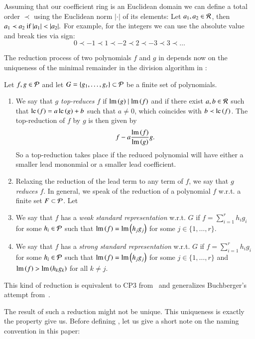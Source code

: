 Assuming that our coefficient ring \er is an Euclidean domain we can define a total
order $\prec$ using the Euclidean norm $|\cdot|$ of its elements: Let $a_1, a_2
\in \mathcal{R}$, then $a_1 \prec a_2 \text{ if } |a_1 | < | a_2 |.$
For example, for the integers we can use the absolute value and break ties via
sign:
\[0\prec -1 \prec 1 \prec -2 \prec 2 \prec -3 \prec 3 \prec \ldots \]

The reduction process of two polynomials $f$ and $g$ in \epr depends now on the
uniqueness of the minimal remainder in the division algorithm in \er:

\begin{definition}
\label{def:reduction}
Let $f, g \in \mathcal{P}$ and let $G= \{g_1,\ldots,g_r\} \subset \mathcal{P}$ be a finite set of
polynomials.
\begin{enumerate}
\item We say that \emph{$g$ top-reduces $f$} if $\operatorname{lm}\left({g}\right) \mid \operatorname{lm}\left({f}\right)$ and if there exist
$a,b \in \mathcal{R}$ such that $\mathrm{lc}\left({f}\right) = a\, \mathrm{lc}\left({g}\right) +b$ such
that $a \neq 0$, which coincides with $b \prec \mathrm{lc}\left({f}\right)$. The top-reduction of $f$
by $g$ is then given by
\[f - a \frac{\operatorname{lm}\left({f}\right)}{\operatorname{lm}\left({g}\right)} g.\]
So a top-reduction takes place if the reduced polynomial will have either a smaller lead
mononmial or a smaller lead coefficient.
\item Relaxing the reduction of the lead term to any term of $f$, we say
that \emph{$g$ reduces $f$}. In general, we speak of the reduction of a
polynomial $f$ w.r.t. a finite set $F\subset \mathcal{P}$.
Let 
\item We say that $f$ has a \emph{weak standard representation} w.r.t. $G$ if
$f = \sum_{i=1}^r h_i g_i$ for some $h_i \in \mathcal{P}$ such that $\operatorname{lm}\left({f}\right) = \operatorname{lm}\left({h_j
  g_j}\right)$ for some $j \in \{1,\ldots,r\}$.
\item We say that $f$ has a \emph{strong standard representation} w.r.t. $G$ if
$f = \sum_{i=1}^r h_i g_i$ for some $h_i \in \mathcal{P}$ such that $\operatorname{lm}\left({f}\right) = \operatorname{lm}\left({h_j
  g_j}\right)$ for some $j \in \{1,\ldots,r\}$ and $\operatorname{lm}\left({f}\right) > \operatorname{lm}\left({h_k g_k}\right)$ for all $k
  \neq j$.
\end{enumerate}
\end{definition}

This kind of reduction is equivalent to CP3 from~\cite{kapur1988} and generalizes
Buchberger's attempt from~\cite{buchberger2ndCriterion1985}.

The result of such a reduction might not be unique. This uniqueness is exactly
the property \emph{\stbs} give us. Before defining \stbs, let us give a short note on
the naming convention in this paper:

